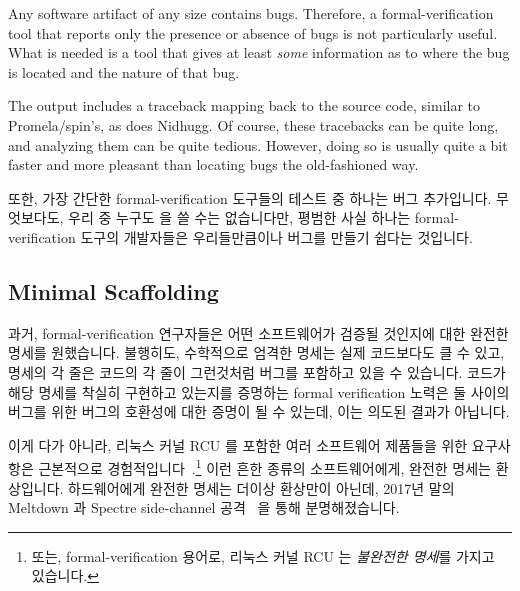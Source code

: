 Any software artifact of any size contains bugs.
Therefore, a formal-verification tool that reports only the
presence or absence of bugs is not particularly useful.
What is needed is a tool that gives at least \emph{some} information
as to where the bug is located and the nature of that bug.

The  output includes a traceback mapping back to the source
code, similar to Promela/spin's, as does Nidhugg.
Of course, these tracebacks can be quite long, and analyzing them
can be quite tedious.
However, doing so is usually quite a bit faster
and more pleasant than locating bugs the old-fashioned way.
\fi

또한, 가장 간단한 formal-verification 도구들의 테스트 중 하나는 버그
추가입니다.
무엇보다도, 우리 중 누구도  을 쓸 수는 없습니다만,
평범한 사실 하나는 formal-verification 도구의 개발자들은 우리들만큼이나 버그를
만들기 쉽다는 것입니다.
\iffalse

In addition, one of the simplest tests of formal-verification tools is
bug injection.
After all, not only could any of us write
\co{printf("VERIFIED\\n")}, but the plain fact is that
developers of formal-verification tools are just as bug-prone as
are the rest of us.
\fi

\subsection{Minimal Scaffolding}
\label{sec:future:Minimal Scaffolding}

과거, formal-verification 연구자들은 어떤 소프트웨어가 검증될 것인지에 대한
완전한 명세를 원했습니다.
불행히도, 수학적으로 엄격한 명세는 실제 코드보다도 클 수 있고, 명세의 각 줄은
코드의 각 줄이 그런것처럼 버그를 포함하고 있을 수 있습니다.
코드가 해당 명세를 착실히 구현하고 있는지를 증명하는 formal verification 노력은
둘 사이의 버그를 위한 버그의 호환성에 대한 증명이 될 수 있는데, 이는 의도된
결과가 아닙니다.

이게 다가 아니라, 리눅스 커널 RCU 를 포함한 여러 소프트웨어 제품들을 위한
요구사항은 근본적으로
경험적입니다~\cite{PaulEMcKenney2015RCUreqts1,PaulEMcKenney2015RCUreqts2,PaulEMcKenney2015RCUreqts3}.\footnote{
	또는, formal-verification 용어로, 리눅스 커널 RCU 는 \emph{불완전한
	명세}를 가지고 있습니다.}
이런 흔한 종류의 소프트웨어에게, 완전한 명세는 환상입니다.
하드웨어에게 완전한 명세는 더이상 환상만이 아닌데, 2017년 말의 Meltdown 과
Spectre side-channel 공격~\cite{JannHorn2018MeltdownSpectre} 을 통해
분명해졌습니다.
\iffalse


